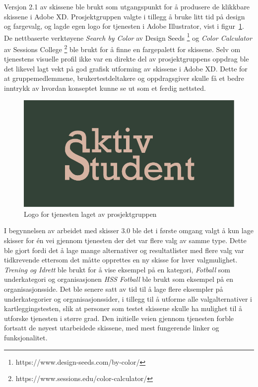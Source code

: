 Versjon 2.1 av skissene ble brukt som utgangspunkt for å produsere de klikkbare skissene i Adobe XD. Prosjektgruppen valgte i tillegg å bruke litt tid på design og fargevalg, og lagde egen logo for tjenesten i Adobe Illustrator, vist i figur~\ref{fig:aktivStudentLogo}. De nettbaserte verktøyene {\em Search by Color} av Design Seeds \footnote{https://www.design-seeds.com/by-color/} og {\em Color Calculator} av Sessions College \footnote{https://www.sessions.edu/color-calculator/} ble brukt for å finne en fargepalett for skissene. Selv om tjenestens visuelle profil ikke var en direkte del av prosjektgruppens oppdrag ble det likevel lagt vekt på god grafisk utforming av skissene i Adobe XD. Dette for at gruppemedlemmene, brukertestdeltakere og oppdragsgiver skulle få et bedre inntrykk av hvordan konseptet kunne se ut som et ferdig nettsted.

\begin{figure}[H]
\centering
\includegraphics[width=.7\textwidth]{Illustrasjoner/aktivstudentlogo.png}
\caption{Logo for tjenesten laget av prosjektgruppen}
\label{fig:aktivStudentLogo}
\end{figure}

I begynnelsen av arbeidet med skisser 3.0 ble det i første omgang valgt å kun lage skisser for én vei gjennom tjenesten der det var flere valg av samme type. Dette ble gjort fordi det å lage mange alternativer og resultatlister med flere valg var tidkrevende ettersom det måtte opprettes en ny skisse for hver valgmulighet. {\em Trening og Idrett} ble brukt for å vise eksempel på en kategori, {\em Fotball} som underkategori og organisasjonen {\em HSS Fotball} ble brukt som eksempel på en organisasjonsside. Det ble senere satt av tid til å lage flere eksempler på underkategorier og organisasjonssider, i tillegg til å utforme alle valgalternativer i kartleggingstesten, slik at personer som testet skissene skulle ha mulighet til å utforske tjenesten i større grad. Den initielle veien gjennom tjenesten forble fortsatt de nøyest utarbeidede skissene, med mest fungerende linker og funksjonalitet.

